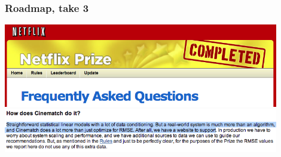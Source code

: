 \documentclass[xcolor=dvipsnames, 9pt]{beamer}
\begin{document}
\begin{frame}
  \frametitle{Roadmap, take 3}

    \begin{center}
      \includegraphics[width=0.9\textwidth]{netflix_faq.png}
      \includegraphics[width=0.9\textwidth]{netflix_cinematch.png}
    \end{center}
\end{frame}





\end{document}
